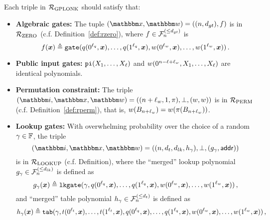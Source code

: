 \begin{definition}
    Each triple in ${\mathcal{R}}_{\text{GPLONK}}$ should satisfy that:
    \begin{itemize}
        \item \textbf{Algebraic gates:} The tuple $(\instR, \witR) = ((n,\dgate), f)$ is in ${\mathcal{R}}_{\text{ZERO}}$ (c.f. Definition~\ref{def:rzero}),
            where $f \in {\mathcal{F}}_{n}^{(\le{d_{gt}})}$ is
            \[
              f(\boldsymbol{x}) \mathrel{\triangleq} \mathtt{gate}(q(0^{\ell_q}, \boldsymbol{x}), \dots, q(1^{\ell_q}, \boldsymbol{x}), w(0^{\ell_w}, \boldsymbol{x}), \dots, w(1^{\ell_w}, \boldsymbol{x})) \,.
            \] 
        \item \textbf{Public input gates:} $\mathtt{pi}(X_1, \dots, X_{\ell})$ and $w(0^{n-\ell+\ell_w}, X_1, \dots, X_{\ell})$
            are identical polynomials.
        \item \textbf{Permutation constraint:} The triple $(\idxR, \instR, \witR)=((n+\lwit, 1, \perm), \bot, (\witp, \witp))$ 
            is in ${\mathcal{R}}_{\text{PERM}}$ (c.f. Definition~\ref{def:rperm}), that is, $w(B_{n+\ell_w}) = w(\pi(B_{n+\ell_w}))$.
        \item \textbf{Lookup gates:} 
            With overwhelming probability over the choice of a random $\gamma \in \mathbb{F}$,
            the triple 
            \[
                (\idxR, \instR, \witR)=((n, \dtab, \dlk, h_{\gamma}), \bot, (g_{\gamma}, \addr))
            \]
            is in ${\mathcal{R}}_{\text{LOOKUP}}$ (c.f. Definition), where the ``merged'' lookup polynomial $g_{\gamma} \in {\mathcal{F}}_{n}^{(\le{d_{lk}})}$ is defined as 
            \[
              g_{\gamma}(\boldsymbol{x}) \mathrel{\triangleq} \mathtt{lkgate}(\gamma, q(0^{\ell_q}, \boldsymbol{x}), \dots, q(1^{\ell_q}, \boldsymbol{x}), w(0^{\ell_w}, \boldsymbol{x}), \dots, w(1^{\ell_w}, \boldsymbol{x})) \,,
            \]
            and ``merged'' table polynomial $h_{\gamma} \in {\mathcal{F}}_{n}^{(\le{d_t})}$ is defined as 
            \[
              h_{\gamma}(\boldsymbol{x}) \mathrel{\triangleq} \mathtt{tab}(\gamma, t(0^{\ell_t}, \boldsymbol{x}), \dots, t(1^{\ell_t}, \boldsymbol{x}), q(0^{\ell_q}, \boldsymbol{x}), \dots, q(1^{\ell_q}, \boldsymbol{x}), w(0^{\ell_w}, \boldsymbol{x}), \dots, w(1^{\ell_w}, \boldsymbol{x})) \,,
            \]
    \end{itemize}
\end{definition}